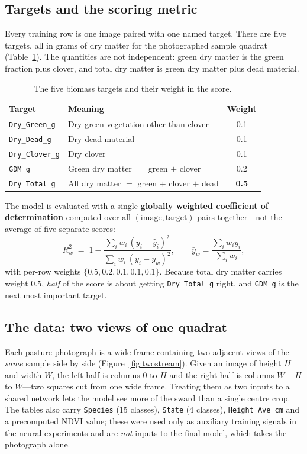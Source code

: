 \documentclass[11pt,a4paper]{article}
\begin{document}
\subsection{Targets and the scoring metric}
Every training row is one image paired with one named target. There are five targets, all in
grams of dry matter for the photographed sample quadrat (Table~\ref{tab:targets}). The quantities
are not independent: green dry matter is the green fraction plus clover, and total dry matter is
green dry matter plus dead material.

\begin{table}[h]
\centering\small
\caption{The five biomass targets and their weight in the score.}
\label{tab:targets}
\begin{tabular}{llc}
\toprule
\textbf{Target} & \textbf{Meaning} & \textbf{Weight} \\
\midrule
\texttt{Dry\_Green\_g} & Dry green vegetation other than clover & 0.1 \\
\texttt{Dry\_Dead\_g}  & Dry dead material & 0.1 \\
\texttt{Dry\_Clover\_g}& Dry clover & 0.1 \\
\texttt{GDM\_g}        & Green dry matter $=$ green $+$ clover & 0.2 \\
\texttt{Dry\_Total\_g} & All dry matter $=$ green $+$ clover $+$ dead & \textbf{0.5} \\
\bottomrule
\end{tabular}
\end{table}

The model is evaluated with a single \textbf{globally weighted coefficient of determination}
computed over all $(\text{image},\text{target})$ pairs together---not the average of five separate
scores:
\begin{equation}
R^2_{w} \;=\; 1 - \frac{\sum_i w_i\,(y_i-\hat{y}_i)^2}{\sum_i w_i\,(y_i-\bar{y}_w)^2},
\qquad \bar{y}_w=\frac{\sum_i w_i y_i}{\sum_i w_i},
\label{eq:wr2}
\end{equation}
with per-row weights $\{0.5,0.2,0.1,0.1,0.1\}$. Because total dry matter carries weight $0.5$,
\emph{half} of the score is about getting \texttt{Dry\_Total\_g} right, and \texttt{GDM\_g} is the
next most important target.

\subsection{The data: two views of one quadrat}
Each pasture photograph is a wide frame containing two adjacent views of the \emph{same} sample
side by side (Figure~\ref{fig:twostream}). Given an image of height $H$ and width $W$, the left
half is columns $0$ to $H$ and the right half is columns $W-H$ to $W$---two squares cut from one
wide frame. Treating them as two inputs to a shared network lets the model see more of the sward
than a single centre crop. The tables also carry \texttt{Species} (15 classes), \texttt{State}
(4 classes), \texttt{Height\_Ave\_cm} and a precomputed NDVI value; these were used only as
auxiliary training signals in the neural experiments and are \emph{not} inputs to the final model,
which takes the photograph alone.
\end{document}
